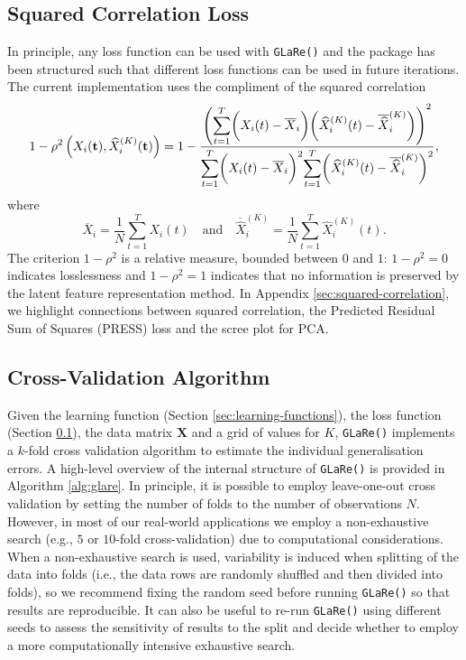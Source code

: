 \subsection{Squared Correlation Loss}\label{sec:loss-functions}

In principle, any loss function can be used with \texttt{GLaRe()} and the package has been structured such that different loss functions can be used in future iterations.
The current implementation uses the compliment of the squared correlation
$$
1- \rho^2 \left(X_i (\mathbf{t}), \widehat{X}^{(K)}_{i} (\mathbf{t}) \right) =
1 - \frac{\left( \mathlarger{\sum}_{t = 1}^T{\bigg(X_i (t) - \overline{X}_i \bigg) \bigg( \widehat{X}_i^{(K)} (t) - \overline{\widehat{X}}_i^{(K)} \bigg)} \right)^2}{\mathlarger{\sum}_{t = 1}^T \bigg(X_i (t) - \overline{X}_i \bigg)^2 \mathlarger{\sum}_{t = 1}^T \bigg( \widehat{X}_i^{(K)} (t) - \overline{\widehat{X}}_i^{(K)} \bigg) ^2},
$$
where
$$
\overline{X}_i = \frac{1}{N} \sum_{t=1}^T X_i (t) \quad \text{and} \quad \overline{\widehat{X}}_i^{(K)} = \frac{1}{N} \sum_{t=1}^T \widehat{X}_i^{(K)} (t).
$$
The criterion $1- \rho^2$ is a relative measure, bounded between $0$ and $1$: $1- \rho^2 = 0$ indicates losslessness and $1- \rho^2 = 1$ indicates that no information is preserved by the latent feature representation method.
In Appendix \ref{sec:squared-correlation}, we highlight connections between squared correlation, the Predicted Residual Sum of Squares (PRESS) loss and the scree plot for PCA.

\subsection{Cross-Validation Algorithm}

Given the learning function (Section \ref{sec:learning-functions}), the loss function (Section \ref{sec:loss-functions}), the data matrix $\mathbf{X}$ and a grid of values for $K$, \texttt{GLaRe()} implements a $k$-fold cross validation algorithm to estimate the individual generalisation errors. 
A high-level overview of the internal structure of \texttt{GLaRe()} is provided in Algorithm \ref{alg:glare}.
In principle, it is possible to employ leave-one-out cross validation by setting the number of folds to the number of observations $N$.
However, in most of our real-world applications we employ a non-exhaustive search (e.g., $5$ or $10$-fold cross-validation) due to computational considerations.
When a non-exhaustive search is used, variability is induced when splitting of the data into folds (i.e., the data rows are randomly shuffled and then divided into folds), so we recommend fixing the random seed before running \texttt{GLaRe()} so that results are reproducible.
It can also be useful to re-run \texttt{GLaRe()} using different seeds to assess the sensitivity of results to the split and decide whether to employ a more computationally intensive exhaustive search.



